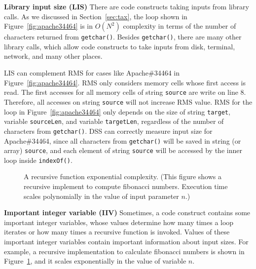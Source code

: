 \noindent\textbf{Library input size (LIS)}
There are code constructs taking inputs from library calls. 
As we discussed in Section~\ref{sec:tax}, 
the loop shown in Figure~\ref{fig:apache34464} 
is in $O(N^2)$ complexity in terms of the number 
of characters returned from \texttt{getchar()}. 
Besides \texttt{getchar()}, there are many other library calls, 
which allow code constructs to take inputs
from disk, terminal, network, and many other places. 

LIS can complement RMS for cases like Apache\#34464 in Figure~\ref{fig:apache34464}.
RMS only considers memory cells whose first access is read. 
The first accesses for all memory cells of string \texttt{source} are write on line $8$.
Therefore, all accesses on string 
\texttt{source} will not increase RMS value.  
RMS for the loop in Figure~\ref{fig:apache34464} only depends 
on the size of string \texttt{target}, 
variable \texttt{sourceLen}, and variable \texttt{targetLen}, 
regardless of the number of characters from \texttt{getchar()}.
DSS can correctly measure input size for Apache\#34464,
since all characters from \texttt{getchar()} will be saved in string (or array) \texttt{source},
and each element of string \texttt{source} 
will be accessed by the inner loop inside \texttt{indexOf()}. 


\begin{figure}
\centering
{}
  \mbox{}
\caption{A recursive function exponential complexity.
\footnotesize{(This figure shows a recursive implement to compute fibonacci numbers. 
Execution time scales polynomially in the value of input parameter $n$.)}}
\vspace{-0.05in}
\label{fig:fib}\vspace{-0.05in}
\end{figure}


\noindent\textbf{Important integer variable (IIV)}
Sometimes, a code construct contains some important integer variables,
whose values determine how many times a loop iterates 
or how many times a recursive function is invoked. 
Values of these important integer variables contain important information about input sizes. 
For example, a recursive implementation to calculate fibonacci numbers is shown in Figure~\ref{fig:fib}, 
and it scales exponentially in the value of variable $n$.

